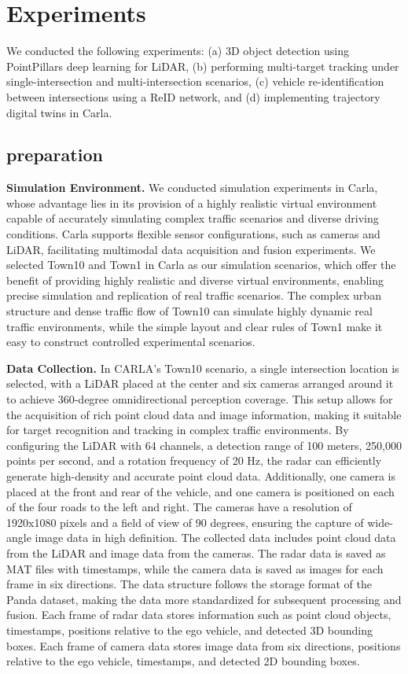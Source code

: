 \section{Experiments}

We conducted the following experiments: 
(a) 3D object detection using PointPillars deep learning for LiDAR, 
(b) performing multi-target tracking under single-intersection and multi-intersection scenarios, 
(c) vehicle re-identification between intersections using a ReID network, and 
(d) implementing trajectory digital twins in Carla.

\subsection{preparation}

\textbf{Simulation Environment.}
We conducted simulation experiments in Carla, whose advantage lies in its provision of a highly realistic virtual environment capable of accurately simulating complex traffic scenarios and diverse driving conditions. 
Carla supports flexible sensor configurations, such as cameras and LiDAR, facilitating multimodal data acquisition and fusion experiments\cite{Alpher22e}. 
We selected Town10 and Town1 in Carla as our simulation scenarios, which offer the benefit of providing highly realistic and diverse virtual environments, enabling precise simulation and replication of real traffic scenarios. 
The complex urban structure and dense traffic flow of Town10 can simulate highly dynamic real traffic environments, while the simple layout and clear rules of Town1 make it easy to construct controlled experimental scenarios.

\textbf{Data Collection.}
In CARLA's Town10 scenario, a single intersection location is selected, with a LiDAR placed at the center and six cameras arranged around it to achieve 360-degree omnidirectional perception coverage. 
This setup allows for the acquisition of rich point cloud data and image information, making it suitable for target recognition and tracking in complex traffic environments. 
By configuring the LiDAR with 64 channels, a detection range of 100 meters, 250,000 points per second, and a rotation frequency of 20 Hz, the radar can efficiently generate high-density and accurate point cloud data. 
Additionally, one camera is placed at the front and rear of the vehicle, and one camera is positioned on each of the four roads to the left and right. 
The cameras have a resolution of 1920x1080 pixels and a field of view of 90 degrees, ensuring the capture of wide-angle image data in high definition. 
The collected data includes point cloud data from the LiDAR and image data from the cameras. 
The radar data is saved as MAT files with timestamps, while the camera data is saved as images for each frame in six directions. 
The data structure follows the storage format of the Panda dataset, making the data more standardized for subsequent processing and fusion\cite{Alpher21c}. 
Each frame of radar data stores information such as point cloud objects, timestamps, positions relative to the ego vehicle, and detected 3D bounding boxes. 
Each frame of camera data stores image data from six directions, positions relative to the ego vehicle, timestamps, and detected 2D bounding boxes.

